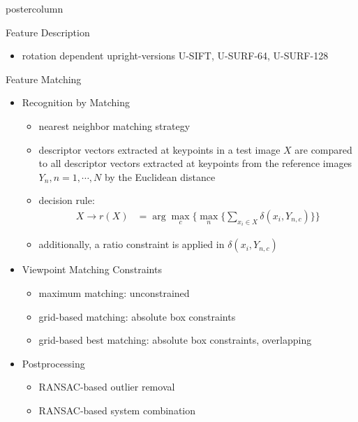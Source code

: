 \documentclass[final,hyperref={pdfpagelabels=false}]{beamer}
\begin{document}
\begin{frame}
\begin{columns}
\begin{column}{.49\textwidth}
\begin{beamercolorbox}[center,wd=\textwidth]{postercolumn}
\begin{minipage}[T]{.95\textwidth}
{\begin{block}{Feature Description}
\begin{itemize}
                \begin{itemize}
                \item rotation dependent upright-versions U-SIFT, U-SURF-64, U-SURF-128
                \end{itemize}
              \end{itemize}
            \end{block}
            \vfill
            \begin{block}{Feature Matching}
              \begin{itemize}
              \item Recognition by Matching
                \begin{itemize}
                \item nearest neighbor matching strategy
                \item descriptor vectors extracted at keypoints in a test image $X$ are compared to all descriptor vectors extracted at keypoints from the reference images $Y_n, n=1,\cdots,N$ by the Euclidean distance
                \item decision rule:
                  \begin{align*}
                    X \rightarrow r(X) & = \arg \max_{c} \Big\{ \max_n \big\{ \sum_{x_i \in X} \delta(x_i,Y_{n,c})\big\} \Big\} 
                  \end{align*}
                \item additionally, a ratio constraint is applied in $\delta(x_i,Y_{n,c})$
                \end{itemize}
              \item Viewpoint Matching Constraints
                \begin{itemize}
                \item maximum matching: unconstrained
                \item grid-based matching: absolute box constraints
                \item grid-based best matching: absolute box constraints, overlapping
                \end{itemize}
              \item Postprocessing
                \begin{itemize}
                \item RANSAC-based outlier removal
                \item RANSAC-based system combination
                \end{itemize}

\end{itemize}
\end{block}}
\end{minipage}
\end{beamercolorbox}
\end{column}
\end{columns}
\end{frame}
\end{document}
